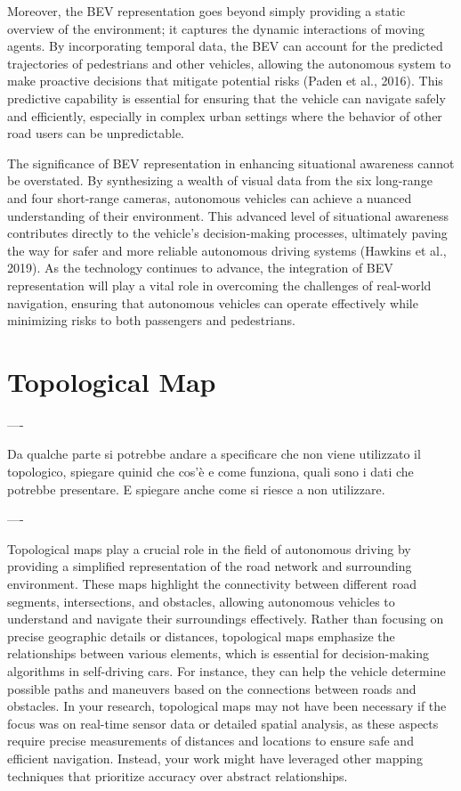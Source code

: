 Moreover, the BEV representation goes beyond simply providing a static overview of the environment; it captures the dynamic interactions of moving agents. By incorporating temporal data, the BEV can account for the predicted trajectories of pedestrians and other vehicles, allowing the autonomous system to make proactive decisions that mitigate potential risks (Paden et al., 2016). This predictive capability is essential for ensuring that the vehicle can navigate safely and efficiently, especially in complex urban settings where the behavior of other road users can be unpredictable.

The significance of BEV representation in enhancing situational awareness cannot be overstated. By synthesizing a wealth of visual data from the six long-range and four short-range cameras, autonomous vehicles can achieve a nuanced understanding of their environment. This advanced level of situational awareness contributes directly to the vehicle's decision-making processes, ultimately paving the way for safer and more reliable autonomous driving systems (Hawkins et al., 2019). As the technology continues to advance, the integration of BEV representation will play a vital role in overcoming the challenges of real-world navigation, ensuring that autonomous vehicles can operate effectively while minimizing risks to both passengers and pedestrians.




\section{Topological Map}

----

Da qualche parte si potrebbe andare a specificare che non viene utilizzato il topologico, spiegare quinid che cos'è e come funziona, quali sono i dati che potrebbe presentare. 
E spiegare anche come si riesce a non utilizzare.

----

Topological maps play a crucial role in the field of autonomous driving by providing a simplified representation of the road network and surrounding environment. These maps highlight the connectivity between different road segments, intersections, and obstacles, allowing autonomous vehicles to understand and navigate their surroundings effectively. Rather than focusing on precise geographic details or distances, topological maps emphasize the relationships between various elements, which is essential for decision-making algorithms in self-driving cars. For instance, they can help the vehicle determine possible paths and maneuvers based on the connections between roads and obstacles. In your research, topological maps may not have been necessary if the focus was on real-time sensor data or detailed spatial analysis, as these aspects require precise measurements of distances and locations to ensure safe and efficient navigation. Instead, your work might have leveraged other mapping techniques that prioritize accuracy over abstract relationships.




